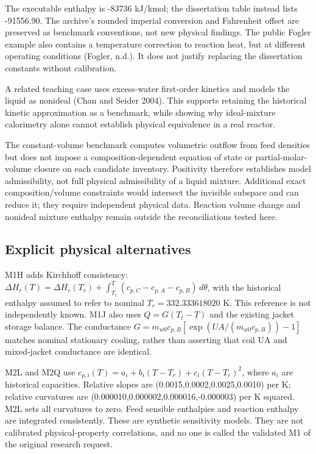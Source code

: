 \documentclass[
  11pt,
]{article}
\begin{document}
The executable enthalpy is -83736 kJ/kmol; the dissertation table
instead lists -91556.90. The archive's rounded imperial conversion and
Fahrenheit offset are preserved as benchmark conventions, not new
physical findings. The public Fogler example also contains a temperature
correction to reaction heat, but at different operating conditions
(Fogler, n.d.). It does not justify replacing the dissertation constants
without calibration.

A related teaching case uses excess-water first-order kinetics and
models the liquid as nonideal (Chan and Seider 2004). This supports
retaining the historical kinetic approximation as a benchmark, while
showing why ideal-mixture calorimetry alone cannot establish physical
equivalence in a real reactor.

The constant-volume benchmark computes volumetric outflow from feed
densities but does not impose a composition-dependent equation of state
or partial-molar-volume closure on each candidate inventory. Positivity
therefore establishes model admissibility, not full physical
admissibility of a liquid mixture. Additional exact composition/volume
constraints would intersect the invisible subspace and can reduce it;
they require independent physical data. Reaction volume change and
nonideal mixture enthalpy remain outside the reconciliations tested
here.

\hypertarget{explicit-physical-alternatives}{%
\subsection{Explicit physical
alternatives}\label{explicit-physical-alternatives}}

M1H adds Kirchhoff consistency:
\(\Delta H_r(T)=\Delta H_r(T_r)+\int_{T_r}^T(c_{p,C}-c_{p,A}-c_{p,B})\,d\theta\),
with the historical enthalpy assumed to refer to nominal
\(T_r=332.333618020\) K. This reference is not independently known. M1J
also uses \(Q=G(T_t-T)\) and the existing jacket storage balance. The
conductance \(G=m_{w0}c_{p,B}[\exp(UA/(m_{w0}c_{p,B}))-1]\) matches
nominal stationary cooling, rather than asserting that coil UA and
mixed-jacket conductance are identical.

M2L and M2Q use \(c_{p,i}(T)=a_i+b_i(T-T_r)+c_i(T-T_r)^2\), where
\(a_i\) are historical capacities. Relative slopes are
(0.0015,0.0002,0.0025,0.0010) per K; relative curvatures are
(0.000010,0.000002,0.000016,-0.000003) per K squared. M2L sets all
curvatures to zero. Feed sensible enthalpies and reaction enthalpy are
integrated consistently. These are synthetic sensitivity models. They
are not calibrated physical-property correlations, and no one is called
the validated M1 of the original research request.
\end{document}
